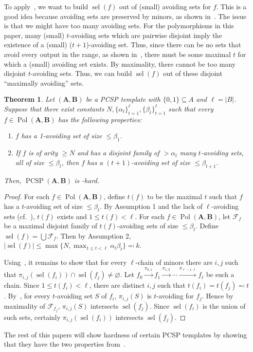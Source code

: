 \documentclass[a4paper,11pt]{article}
\renewcommand\emptyset\varnothing
\newcommand{\2}{\vec{2}}
\newcommand{\1}{\vec{1}}
\newcommand{\0}{\vec{0}}
\renewcommand{\A}{\ensuremath{\mathbf{A}}}
\newcommand{\B}{\ensuremath{\mathbf{B}}}
\DeclareMathOperator{\sel}{sel}
\DeclareMathOperator{\PCSP}{PCSP}
\DeclareMathOperator{\Pol}{Pol}
\theoremstyle{plain}
\newtheorem{theorem}{Theorem}
\theoremstyle{definition}
\begin{document}
To apply~, we want to build $\sel(f)$ out of (small)
avoiding sets for $f$. This is a good idea because avoiding sets are preserved
by minors, as shown in~. The issue is that we might have too many
avoiding sets. For the polymorphisms in this paper, many (small) $t$-avoiding
sets which are pairwise disjoint imply the existence of a (small)
($t+1$)-avoiding set. Thus, since there can be no sets that avoid every output
in the range, as shown in~, there must be some maximal $t$ for which a (small) avoiding set exists. By maximality, there cannot be too many disjoint $t$-avoiding sets. Thus, we can build $\sel(f)$ out of these disjoint ``maximally avoiding'' sets.

\begin{theorem}\label{our hardness condition}
  Let $(\A,\B)$ be a PCSP template with $\{0, 1\} \subseteq A$ and $\ell = |B|$.
Suppose that there exist constants $N,\{\alpha_t\}_{t=1}^\ell,\{\beta_t\}_{t=1}^\ell$ such that every $f \in \Pol(\A,\B)$ has the following properties:
\begin{enumerate}
    \item $f$ has a 1-avoiding set of size $\leq \beta_1$.
    \item If $f$ is of arity $\geq N$ and has a disjoint family of $> \alpha_t$ many $t$-avoiding sets, all of size $\leq \beta_t$, then $f$ has a $(t+1)$-avoiding set of size $\leq \beta_{t+1}$.
\end{enumerate}
Then, $\PCSP(\A,\B)$ is \NP-hard.
\end{theorem}
\begin{proof}
For each $f \in \Pol(\A,\B)$, define $t(f)$ to be the maximal $t$ such that $f$
  has a $t$-avoiding set of size $\leq \beta_t$. By Assumption 1 and the lack 
  of $\ell$-avoiding sets (cf.~),  $t(f)$ exists and $1\leq t(f) <
  \ell$. For each $f\in \Pol(\A,\B)$, let $\mathcal{F}_f$ be a maximal disjoint family of $t(f)$-avoiding sets of size $\leq \beta_t$. Define $\sel(f) = \bigcup \mathcal{F}_f$. Then by Assumption 2, $|\sel(f)| \leq \max\{N,\max_{1\leq t<\ell} \alpha_t\beta_t\} \eqqcolon k$.
  
Using~, it remains to show that for every $\ell$-chain
  of minors there are $i, j$ such that $\pi_{i,
  j}\left(\sel\left(f_i\right)\right) \cap \sel\left(f_j\right) \neq \emptyset$.
  Let $f_0 \xrightarrow{\pi_{0,1}} f_1 \xrightarrow{\pi_{1,2}} \cdots
  \xrightarrow{\pi_{\ell-1, \ell}} f_{\ell}$ be such a chain. Since $1\leq
  t(f_i) < \ell$, there are distinct $i,j$ such that $t(f_i)=t(f_j) \eqqcolon
  t$. By~, for every $t$-avoiding set $S$ of
  $f_i$, $\pi_{i,j}(S)$ is $t$-avoiding for $f_j$. Hence by maximality of $\mathcal{F}_{f_j}$, $\pi_{i,j}(S)$ intersects $\sel(f_j)$. Since $\sel(f_i)$ is the union of such sets, certainly $\pi_{i,j}(\sel(f_i))$ intersects $\sel(f_j)$.
\end{proof}
The rest of this papers will show hardness of certain PCSP templates by showing that they have the two properties from~.
\end{document}
